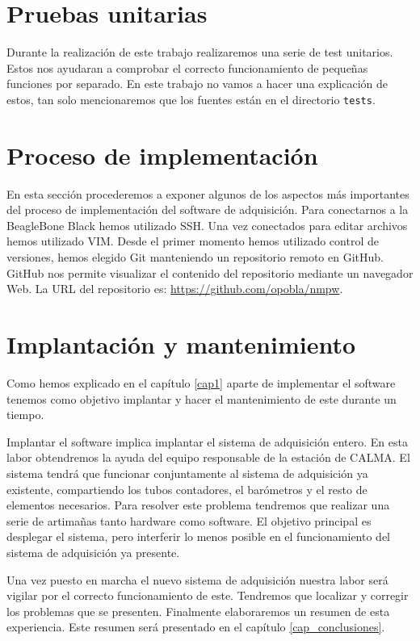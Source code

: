 \section{Pruebas unitarias}
	Durante la realización de este trabajo realizaremos una serie de test unitarios\cite{UnitTest}. Estos nos ayudaran a comprobar el correcto
	funcionamiento de pequeñas funciones por separado. En este trabajo no vamos a hacer una explicación de estos, tan solo mencionaremos que los
	fuentes están en el directorio \texttt{tests}.
\section{Proceso de implementación}
	En esta sección procederemos a exponer algunos de los aspectos más importantes del proceso de implementación del software de adquisición. Para
	conectarnos a la BeagleBone Black hemos utilizado SSH\cite{ssh}. Una vez conectados para editar archivos hemos utilizado VIM\cite{vim}. Desde
	el primer momento hemos utilizado control de versiones, hemos elegido Git\cite{git} manteniendo un repositorio remoto en GitHub\cite{github}.
	GitHub nos permite visualizar el contenido del repositorio mediante un navegador Web. La URL del repositorio es: 
	\url{https://github.com/opobla/nmpw}.

\section{Implantación y mantenimiento}
	Como hemos explicado en el capítulo \ref{cap1} aparte de implementar el software tenemos como objetivo implantar y hacer el mantenimiento de
	este durante un tiempo. 
	\par
	Implantar el software implica implantar el sistema de adquisición entero. En esta labor obtendremos la ayuda del equipo responsable de la
	estación de CALMA. El sistema tendrá que funcionar conjuntamente al sistema de adquisición ya existente, compartiendo los tubos contadores, el
	barómetros y el resto de elementos necesarios. Para resolver este problema tendremos que realizar una serie de artimañas tanto hardware como
	software. El objetivo principal es desplegar el sistema, pero interferir lo menos posible en el funcionamiento del sistema de adquisición ya presente. 
	\par
	Una vez puesto en marcha el nuevo sistema de adquisición nuestra labor será vigilar por el correcto funcionamiento de este. Tendremos que
	localizar y corregir los problemas que se presenten. Finalmente elaboraremos un resumen de esta experiencia. Este resumen será presentado en
	el capítulo \ref{cap_conclusiones}.
